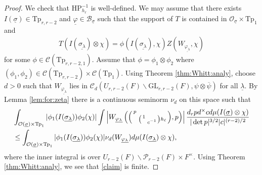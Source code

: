 \documentclass[12pt]{amsart}
\theoremstyle{remark}
\numberwithin{equation}{section}
\newcommand{\GL}{\mathrm{GL}}
\newcommand{\OO}{\mathcal{O}}
\theoremstyle{definition}
\newenvironment{psmatrix}
  {\left(\begin{smallmatrix}}
  {\end{smallmatrix}\right)}
\numberwithin{equation}{subsection}
\begin{document}
\begin{proof}
We check that $\mathrm{HP}_{h_\ell}^{-1}$ is  well-defined.  
We may assume that there exists $I(\underline{\sigma}) \in \mathrm{Tp}_{r,r-2}$ and $\underline{\varphi} \in \mathcal{B}_{\underline{\sigma}}$ such that the support of $T$ is contained in $\OO_{\underline{\sigma}} \times \mathrm{Tp}_1$ and
\begin{align*}
T(I(\underline{\sigma_{\lambda}}) \otimes \chi)=\phi(I(\underline{\sigma_\lambda}),\chi)Z(W_{\underline{\varphi_\lambda}},\chi)
\end{align*}
for some $\phi \in \mathcal{C}(\mathrm{Tp}_{r,r-2,1}).$ Assume that $\phi=\phi_1 \otimes \phi_2$ where $(\phi_1,\phi_2) \in \mathcal{C}(\mathrm{Tp}_{r,r-2}) \times \mathcal{C}(\mathrm{Tp}_1).$  
Using Theorem \ref{thm:Whitt:analy}, choose $d>0$ such that $W_{\underline{\varphi_{\lambda}}}$
lies in $\mathcal{C}_d(U_{r,r-2}(F) \backslash \GL_{r,r-2}(F),\psi \otimes \overline{\psi})$
for all $\underline{\lambda}.$  
By Lemma \ref{lem:for:zeta} there is a continuous seminorm $\nu_{d}$ on this space such that 
\begin{align} \label{claim}\begin{split}
   & \int_{\mathcal{O}(\underline{\sigma}) \times \mathrm{Tp}_{1}}|\phi_1(I(\underline{\sigma_{\lambda}}))\phi_2(\chi)|\int\left|W_{\underline{\varphi_{\lambda}}}\left(\begin{psmatrix}p & \\ &  \begin{psmatrix} 1 & \\ & c^{-1} \end{psmatrix}h_\ell\end{psmatrix},p  \right)\right|\frac{d_r pd^\times cd\mu(I(\underline{\sigma})\otimes \chi)}{|\det p|^{3/2}|c|^{(r-2)/2}}\\
    & \leq \int_{\mathcal{O}(\underline{\sigma}) \times \mathrm{Tp}_{1}}|\phi_1(I(\underline{\sigma_{\lambda}}))\phi_2(\chi)|\nu_d(W_{\underline{\varphi_{\lambda}}})d\mu(I(\underline{\sigma_\lambda}) \otimes \chi), \end{split}
\end{align}
where the inner integral is over 
$U_{r-2}(F) \backslash \mathcal{P}_{r-2}(F) \times F^\times.$
Using Theorem \ref{thm:Whitt:analy}, we see that \eqref{claim} is finite.


\end{proof}
\end{document}
